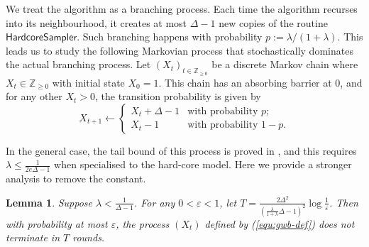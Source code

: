 \documentclass[10pt,a4paper]{article}
\newtheorem{lemma}{Lemma}[section]
\newcommand{\hcsampler}{\mathsf{HardcoreSampler}}
\begin{document}
We treat the algorithm as a branching process. 
Each time the algorithm recurses into its neighbourhood, it creates at most $\Delta-1$ new copies of the routine $\hcsampler{}$. 
Such branching happens with probability $p:=\lambda/(1+\lambda)$. 
This leads us to study the following Markovian process that stochastically dominates the actual branching process. 
Let $(X_t)_{t\in\mathbb{Z}_{\geq 0}}$ be a discrete Markov chain where $X_t\in\mathbb{Z}_{\geq 0}$ with initial state $X_0=1$. 
This chain has an absorbing barrier at $0$, and for any other $X_t>0$, the transition probability is given by
\begin{equation} \label{equ:gwb-def}
  X_{t+1}\leftarrow\begin{cases}
  X_t+\Delta-1 & \text{with probability } p; \\
  X_t-1 & \text{with probability } 1-p. 
  \end{cases}
\end{equation}

In the general case, the tail bound of this process is proved in \cite[Lemma B.12]{FGWWY22}, and this requires $\lambda\leq\frac{1}{2e\Delta-1}$ when specialised to the hard-core model. 
Here we provide a stronger analysis to remove the constant. 

\begin{lemma}\label{lem:gwb-terminate}
  Suppose $\lambda<\frac{1}{\Delta-1}$.
  For any $0<\varepsilon<1$, 
  let $T=\frac{2\Delta^2}{\left(\frac{\lambda}{1+\lambda}\Delta-1\right)^2}\log\frac{1}{\varepsilon}$. 
  Then with probability at most $\varepsilon$, the process $(X_t)$ defined by (\ref{equ:gwb-def}) does not terminate in $T$ rounds.  
\end{lemma}
\end{document}
